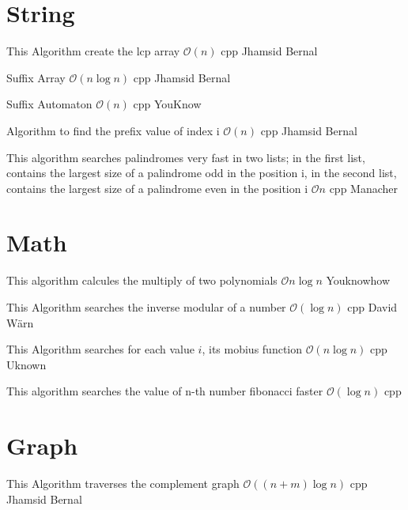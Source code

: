 \section{String}

{This Algorithm create the lcp array}
{$\mathcal{O}(n)$}
{cpp}{}
{Jhamsid Bernal}

{Suffix Array}
{$\mathcal{O}(n \log{n})$}
{cpp}{}
{Jhamsid Bernal}
\progress

{Suffix Automaton}
{$\mathcal{O}(n)$}
{cpp}{}
{YouKnow}
\progress

{Algorithm to find the prefix value of index i}
{$\mathcal{O}(n)$}
{cpp}{}
{Jhamsid Bernal}
\progress

{This algorithm searches palindromes very fast in two lists; in the first list, contains the largest size of a palindrome odd in the position i, in the second list, contains the largest size of a palindrome even in the position i}
{$\mathcal{O}{n}$}
{cpp}{}
{Manacher}
\section{Math}

{This algorithm calcules the multiply of two polynomials}
{$\mathcal{O}{n \log{n}}$}
{Youknowhow}

{This Algorithm searches the inverse modular of a number}
{$\mathcal{O}(\log{n})$}
{cpp}{}
{David Wärn}

{This Algorithm searches for each value $i$, its mobius function}
{$\mathcal{O}(n\log{n})$}
{cpp}{}
{Uknown}

{This algorithm searches the value of n-th number fibonacci faster}
{$\mathcal{O}(\log{n})$}
{cpp}{}

\section{Graph}

{This Algorithm traverses the complement graph}
{$\mathcal{O}((n + m)\log{n})$}
{cpp}{}
{Jhamsid Bernal}
\progress

